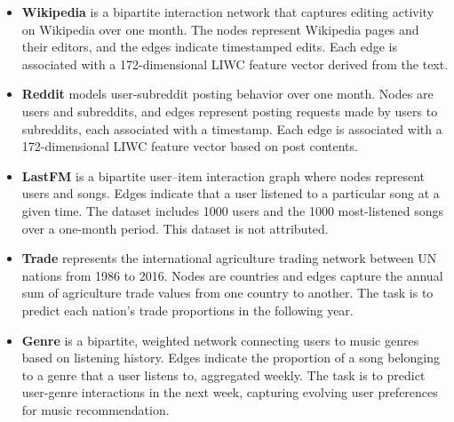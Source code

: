 \begin{itemize}[leftmargin=*, noitemsep, topsep=0.2pt]
    \item \textbf{Wikipedia} is a bipartite interaction network that captures editing activity on Wikipedia over one month. The nodes represent Wikipedia pages and their editors, and the edges indicate timestamped edits. Each edge is associated with a 172-dimensional LIWC feature vector derived from the text.  
    \item \textbf{Reddit} models user-subreddit posting behavior over one month. Nodes are users and subreddits, and edges represent posting requests made by users to subreddits, each associated with a timestamp. Each edge is associated with a 172-dimensional LIWC feature vector based on post contents.  
    \item \textbf{LastFM} is a bipartite user–item interaction graph where nodes represent users and songs. Edges indicate that a user listened to a particular song at a given time. The dataset includes 1000 users and the 1000 most-listened songs over a one-month period. 
    This dataset is not attributed.
    \item \textbf{Trade} represents the international agriculture trading network between UN nations from 1986 to 2016. Nodes are countries and edges capture the annual sum of agriculture trade values from one country to another. The task is to predict each nation’s trade proportions in the following year.
    \item \textbf{Genre} is a bipartite, weighted network connecting users to music genres based on listening history. Edges indicate the proportion of a song belonging to a genre that a user listens to, aggregated weekly. The task is to predict user-genre interactions in the next week, capturing evolving user preferences for music recommendation.
\end{itemize}


